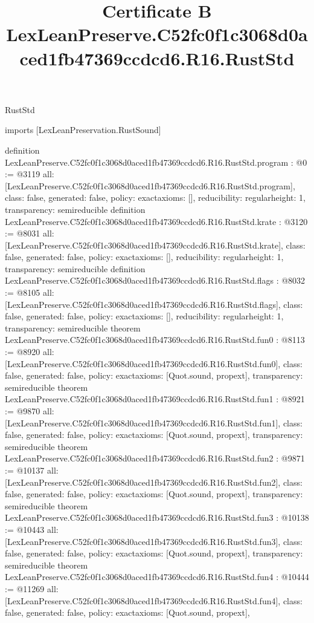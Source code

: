 \begin{lexlean}{RustStd}
\title{Certificate B LexLeanPreserve.C52fc0f1c3068d0aced1fb47369ccdcd6.R16.RustStd}
\begin{coremodule}
imports [LexLeanPreservation.RustSound]

definition LexLeanPreserve.C52fc0f1c3068d0aced1fb47369ccdcd6.R16.RustStd.program : @0 := @3119 {
  all: [LexLeanPreserve.C52fc0f1c3068d0aced1fb47369ccdcd6.R16.RustStd.program],
  class: false,
  generated: false,
  policy: exact{axioms: []},
  reducibility: regular{height: 1},
  transparency: semireducible
}
definition LexLeanPreserve.C52fc0f1c3068d0aced1fb47369ccdcd6.R16.RustStd.krate : @3120 := @8031 {
  all: [LexLeanPreserve.C52fc0f1c3068d0aced1fb47369ccdcd6.R16.RustStd.krate],
  class: false,
  generated: false,
  policy: exact{axioms: []},
  reducibility: regular{height: 1},
  transparency: semireducible
}
definition LexLeanPreserve.C52fc0f1c3068d0aced1fb47369ccdcd6.R16.RustStd.flags : @8032 := @8105 {
  all: [LexLeanPreserve.C52fc0f1c3068d0aced1fb47369ccdcd6.R16.RustStd.flags],
  class: false,
  generated: false,
  policy: exact{axioms: []},
  reducibility: regular{height: 1},
  transparency: semireducible
}
theorem LexLeanPreserve.C52fc0f1c3068d0aced1fb47369ccdcd6.R16.RustStd.fun0 : @8113 := @8920 {
  all: [LexLeanPreserve.C52fc0f1c3068d0aced1fb47369ccdcd6.R16.RustStd.fun0],
  class: false,
  generated: false,
  policy: exact{axioms: [Quot.sound, propext]},
  transparency: semireducible
}
theorem LexLeanPreserve.C52fc0f1c3068d0aced1fb47369ccdcd6.R16.RustStd.fun1 : @8921 := @9870 {
  all: [LexLeanPreserve.C52fc0f1c3068d0aced1fb47369ccdcd6.R16.RustStd.fun1],
  class: false,
  generated: false,
  policy: exact{axioms: [Quot.sound, propext]},
  transparency: semireducible
}
theorem LexLeanPreserve.C52fc0f1c3068d0aced1fb47369ccdcd6.R16.RustStd.fun2 : @9871 := @10137 {
  all: [LexLeanPreserve.C52fc0f1c3068d0aced1fb47369ccdcd6.R16.RustStd.fun2],
  class: false,
  generated: false,
  policy: exact{axioms: [Quot.sound, propext]},
  transparency: semireducible
}
theorem LexLeanPreserve.C52fc0f1c3068d0aced1fb47369ccdcd6.R16.RustStd.fun3 : @10138 := @10443 {
  all: [LexLeanPreserve.C52fc0f1c3068d0aced1fb47369ccdcd6.R16.RustStd.fun3],
  class: false,
  generated: false,
  policy: exact{axioms: [Quot.sound, propext]},
  transparency: semireducible
}
theorem LexLeanPreserve.C52fc0f1c3068d0aced1fb47369ccdcd6.R16.RustStd.fun4 : @10444 := @11269 {
  all: [LexLeanPreserve.C52fc0f1c3068d0aced1fb47369ccdcd6.R16.RustStd.fun4],
  class: false,
  generated: false,
  policy: exact{axioms: [Quot.sound, propext]},
}
\end{coremodule}
\end{lexlean}
